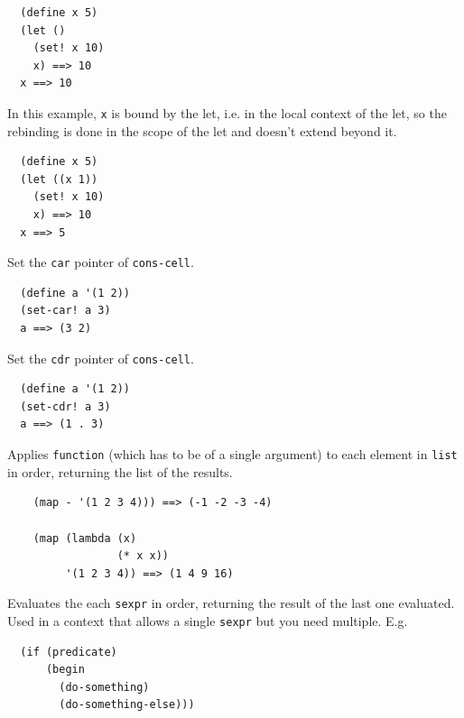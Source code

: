 \documentclass[12pt]{article}
\begin{document}
\begin{verbatim}
  (define x 5)
  (let ()
    (set! x 10)
    x) ==> 10
  x ==> 10
\end{verbatim}

In this example, \verb|x| is bound by the let, i.e. in the local
context of the let, so the rebinding is done in the scope of the let
and doesn't extend beyond it.

\begin{verbatim}
  (define x 5)
  (let ((x 1))
    (set! x 10)
    x) ==> 10
  x ==> 5
\end{verbatim}


Set the \verb|car| pointer of \verb|cons-cell|.

\begin{verbatim}
  (define a '(1 2))
  (set-car! a 3)
  a ==> (3 2)
\end{verbatim}


Set the \verb|cdr| pointer of \verb|cons-cell|.

\begin{verbatim}
  (define a '(1 2))
  (set-cdr! a 3)
  a ==> (1 . 3)
\end{verbatim}


Applies \verb|function| (which has to be of a single argument) to each
element in \verb|list| in order, returning the list of the results. 

\begin{verbatim}
    (map - '(1 2 3 4))) ==> (-1 -2 -3 -4)

    (map (lambda (x)
                 (* x x))
         '(1 2 3 4)) ==> (1 4 9 16)
\end{verbatim}


Evaluates the each \verb|sexpr| in order, returning the result of the
last one evaluated. Used in a context that allows a single
\verb|sexpr| but you need multiple. E.g.

\begin{verbatim}
  (if (predicate)
      (begin
        (do-something)
        (do-something-else)))
\end{verbatim}

\end{document}
